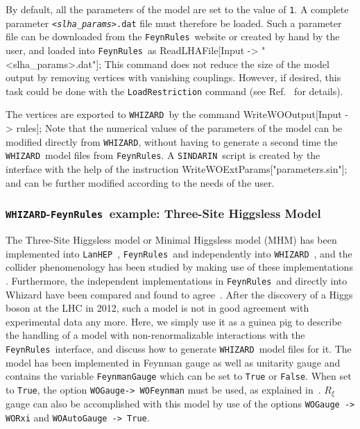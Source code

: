 \documentclass[12pt]{book}
\newenvironment{code}%
  {\begingroup\footnotesize
   \quote
   \Verbatim}%
  {\endVerbatim
   \endquote
   \endgroup\noindent}
\newcommand{\ttt}[1]{\texttt{#1}}
\newcommand{\whizard}{\ttt{WHIZARD}}
\newcommand{\FeynRules}{\ttt{FeynRules}}
\newcommand{\sindarin}{\ttt{SINDARIN}}
\begin{document}
By default, all the parameters of the model are set to the value of
\ttt{1}. A complete parameter \ttt{{\em <slha\_params>}.dat} file
must therefore be loaded. Such a parameter file can be downloaded from
the \FeynRules\ website or created by hand by the user, and loaded
into \FeynRules\ as
\begin{code}
ReadLHAFile[Input -> "<slha_params>.dat"];
\end{code}
This command does not reduce the size of the model output by removing
vertices with vanishing couplings.  However, if desired, this task
could be done with the  \ttt{LoadRestriction} command (see Ref.\
\cite{Fuks:2012im} for details).

The vertices are exported to \whizard\ by the command
\begin{code}
WriteWOOutput[Input -> rules];
\end{code}
Note that the numerical values of the parameters of the model can be
modified directly from \whizard, without having to generate a second
time the \whizard\ model files from \FeynRules. A \sindarin\ script is
created by the interface with the help of the instruction
\begin{code}
WriteWOExtParams["parameters.sin"];
\end{code}
and can be further modified according to the needs of the user.

\subsubsection{\whizard-\FeynRules\ example: Three-Site Higgsless Model}


The Three-Site Higgsless model or Minimal Higgsless model (MHM) has
been implemented into \ttt{LanHEP}~\cite{He:2007ge}, \FeynRules\
and independently into \whizard~\cite{Speckner:2010zi},
and the collider phenomenology has been studied by making use of these
implementations \cite{He:2007ge,Ohl:2010zf,Speckner:2010zi}.
Furthermore, the independent implementations in \FeynRules\ and
directly into {\sc Whizard} have been compared and found to
agree~\cite{Christensen:2010wz}. After the discovery of a Higgs boson
at the LHC in 2012, such a model is not in good agreement with
experimental data any more. Here, we simply use it as a guinea pig to
describe the handling of a model with non-renormalizable interactions
with the \FeynRules\ interface, and discuss how to generate \whizard\
model files for it. The model has been implemented in Feynman gauge as
well as unitarity gauge and contains the variable \verb|FeynmanGauge|
which can be set to \verb|True|  or \verb|False|. When set to
\verb|True|, the option \verb|WOGauge-> WOFeynman| must be used, as
explained in~\cite{Christensen:2010wz}. $R_\xi$ gauge can also be
accomplished with this model by use of the options
\verb|WOGauge -> WORxi| and \verb?WOAutoGauge -> True?.
\end{document}
